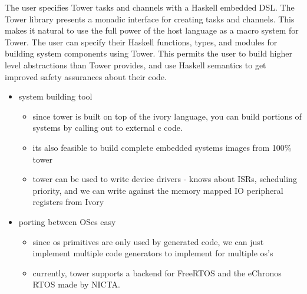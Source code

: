 The user specifies Tower tasks and channels with a Haskell embedded DSL. The
Tower library presents a monadic interface for creating tasks and channels.
This makes it natural to use the full power of the host language as a macro
system for Tower. The user can specify their Haskell functions, types, and
modules for building system components using Tower. This permits the user to
build higher level abstractions than Tower provides, and use Haskell semantics
to get improved safety assurances about their code.

\begin{itemize}
\item system building tool
	\begin{itemize}
		\item since tower is built on top of the ivory language, you can
			build portions of systems by calling out to external c
			code.
		\item its also feasible to build complete embedded systems
			images from 100\% tower
		\item tower can be used to write device drivers - knows about
			ISRs, scheduling priority, and we can write against the
			memory mapped IO peripheral registers from Ivory
	\end{itemize}
\item porting between OSes easy
	\begin{itemize}
		\item since os primitives are only used by generated code, we
			can just implement multiple code generators to
			implement for multiple os's
		\item currently, tower supports a backend for FreeRTOS and the
			eChronos RTOS made by NICTA.
	\end{itemize}
\end{itemize}
